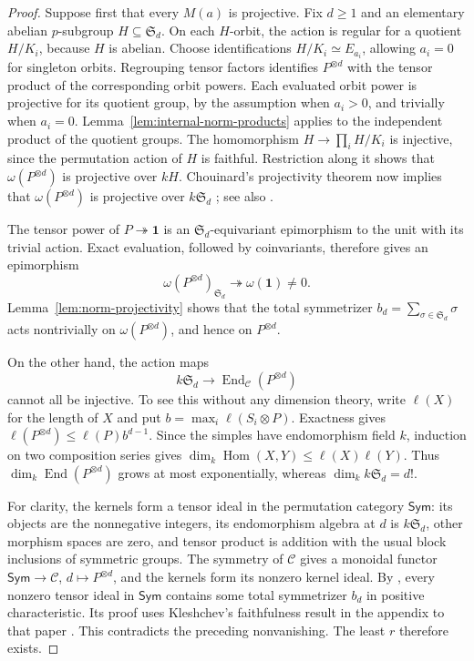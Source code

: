 \begin{proof}
Suppose first that every $M(a)$ is projective.  Fix $d\ge1$ and an
elementary abelian $p$-subgroup $H\subseteq\mathfrak S_d$.
On each $H$-orbit, the action is regular for a quotient $H/K_i$, because
$H$ is abelian.  Choose identifications $H/K_i\simeq E_{a_i}$, allowing
$a_i=0$ for singleton orbits.  Regrouping tensor factors identifies
$P^{\otimes d}$ with the tensor product of the corresponding orbit
powers.  Each evaluated orbit power is projective for its quotient
group, by the assumption when $a_i>0$, and trivially when $a_i=0$.
Lemma~\ref{lem:internal-norm-products} applies to the independent
product of the quotient groups.  The homomorphism
$H\to\prod_iH/K_i$ is injective, since the permutation action of $H$
is faithful.  Restriction along it shows that
$\omega(P^{\otimes d})$ is projective over $kH$.
Chouinard's projectivity theorem now implies that
$\omega(P^{\otimes d})$ is projective over $k\mathfrak S_d$
\cite{Chouinard1976}; see also
\cite[p.~20]{Benson2015}.

The tensor power of $P\twoheadrightarrow\mathbf1$ is an
$\mathfrak S_d$-equivariant epimorphism to the unit with its trivial
action.  Exact evaluation, followed by coinvariants, therefore gives an
epimorphism
\[
 \omega(P^{\otimes d})_{\mathfrak S_d}
 \twoheadrightarrow\omega(\mathbf1)\ne0.
\]
Lemma~\ref{lem:norm-projectivity} shows that the total symmetrizer
$b_d=\sum_{\sigma\in\mathfrak S_d}\sigma$ acts nontrivially on
$\omega(P^{\otimes d})$, and hence on $P^{\otimes d}$.

On the other hand, the action maps
\[
 k\mathfrak S_d\longrightarrow
 \operatorname{End}_{\mathcal C}(P^{\otimes d})
\]
cannot all be injective.  To see this without any dimension theory,
write $\ell(X)$ for the length of $X$ and put
$b=\max_i\ell(S_i\otimes P)$.  Exactness gives
$\ell(P^{\otimes d})\le\ell(P)b^{d-1}$.
Since the simples have endomorphism field $k$, induction on two
composition series gives
$\dim_k\operatorname{Hom}(X,Y)\le\ell(X)\ell(Y)$.
Thus $\dim_k\operatorname{End}(P^{\otimes d})$ grows at most
exponentially, whereas $\dim_k k\mathfrak S_d=d!$.

For clarity, the kernels form a tensor ideal in the permutation category
$\mathsf{Sym}$: its objects are the nonnegative integers, its
endomorphism algebra at $d$ is $k\mathfrak S_d$, other morphism spaces
are zero, and tensor product is addition with the usual block inclusions
of symmetric groups.  The symmetry of $\mathcal C$ gives a monoidal
functor $\mathsf{Sym}\to\mathcal C$, $d\mapsto P^{\otimes d}$, and
the kernels form its nonzero kernel ideal.  By
\cite[Lemma~4.10]{CoulembierEtingofOstrik2023}, every nonzero tensor
ideal in $\mathsf{Sym}$ contains some total symmetrizer $b_d$ in
positive characteristic. Its proof uses Kleshchev's faithfulness result
in the appendix to that paper \cite[Appendix~A, Proposition~A.1]{CoulembierEtingofOstrik2023}.
This contradicts the preceding nonvanishing.
The least $r$ therefore exists.


\end{proof}

